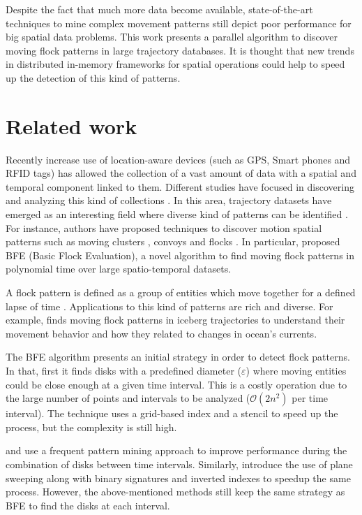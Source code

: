 Despite the fact that much more data become available, state-of-the-art techniques to mine complex movement patterns still depict poor performance for big spatial data problems.  This work presents a parallel algorithm to discover moving flock patterns in large trajectory databases.  It is thought that new trends in distributed in-memory frameworks for spatial operations could help to speed up the detection of this kind of patterns.

\section{Related work}
Recently increase use of location-aware devices (such as GPS, Smart phones and RFID tags) has allowed the collection of a vast amount of data with a spatial and temporal component linked to them.  Different studies have focused in discovering and analyzing this kind of collections \cite{leung_knowledge_2010, miller_geographic_2001}.  In this area, trajectory datasets have emerged as an interesting field where diverse kind of patterns can be identified \cite{zheng_computing_2011, vieira_spatio-temporal_2013}.  For instance, authors have proposed techniques to discover motion spatial patterns such as moving clusters \cite{kalnis_discovering_2005}, convoys \cite{jeung_discovery_2008} and flocks \cite{benkert_reporting_2008, gudmundsson_computing_2006}.  In particular, \cite{vieira_2009} proposed BFE (Basic Flock Evaluation), a novel algorithm to find moving flock patterns in polynomial time over large spatio-temporal datasets. 

A flock pattern is defined as a group of entities which move together for a defined lapse of time \cite{benkert_reporting_2008}.  Applications to this kind of patterns are rich and diverse.  For example, \cite{calderon_romero_mining_2011} finds moving flock patterns in iceberg trajectories to understand their movement behavior and how they related to changes in ocean's currents. 

The BFE algorithm presents an initial strategy in order to detect flock patterns.  In that, first it finds disks with a predefined diameter ($\varepsilon$) where moving entities could be close enough at a given time interval.  This is a costly operation due to the large number of points and intervals to be analyzed ($\mathcal{O}(2n^2)$ per time interval).  The technique uses a grid-based index and a stencil to speed up the process, but the complexity is still high.

\cite{calderon_romero_mining_2011} and \cite{turdukulov_visual_2014} use a frequent pattern mining approach to improve performance during the combination of disks between time intervals.  Similarly, \cite{tanaka_improved_2016} introduce the use of plane sweeping along with binary signatures and inverted indexes to speedup the same process.  However, the above-mentioned methods still keep the same strategy as BFE to find the disks at each interval.  

